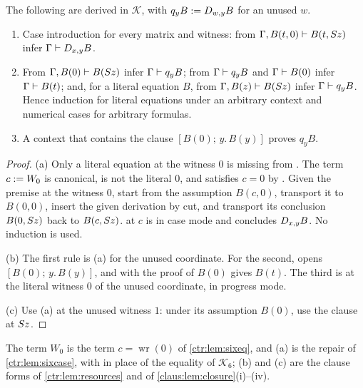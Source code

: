 \begin{proposition}
\label{disch:prop:sd-basis}
The following are derived in $\mathcal K$, with $q_yB\mathrel{:=}D_{w,y}B$ for
an unused $w$.
\begin{enumerate}[label=\textup{(\alph*)}]
\item Case introduction for every matrix and witness: from
 $\Gamma,B(t,0)\vdash B(t,S z)$ infer $\Gamma\vdash D_{x,y}B$.
\item From $\Gamma,B(0)\vdash B(S z)$ infer $\Gamma\vdash q_yB$; from
 $\Gamma\vdash q_yB$ and $\Gamma\vdash B(0)$ infer $\Gamma\vdash B(t)$;
 and, for a literal equation $B$, from $\Gamma,B(z)\vdash B(S z)$
 infer $\Gamma\vdash q_yB$. Hence induction for literal equations under
 an arbitrary context and numerical cases for arbitrary formulas.
\item A context that contains the clause $[B(0);\,y.\,B(y)]$ proves
 $q_yB$.
\end{enumerate}
\end{proposition}

\begin{proof}
(a) Only a literal equation at the witness $0$ is missing from
. The term $c\mathrel{:=} W_0$ is canonical, is not the literal
$0$, and satisfies $c=0$ by . Given the premise at the
witness $0$, start from the assumption $B(c,0)$, transport it to $B(0,0)$,
insert the given derivation by cut, and transport its conclusion
$B(0,S z)$ back to $B(c,S z)$.  at $c$ is in case
mode and concludes $D_{x,y}B$. No induction is used.

(b) The first rule is (a) for the unused coordinate. For the second,
 opens $[B(0);\,y.\,B(y)]$, and  with the
proof of $B(0)$ gives $B(t)$. The third is  at the literal
witness $0$ of the unused coordinate, in progress mode.

(c) Use (a) at the unused witness $1$: under its assumption $B(0)$, use
the clause at $S z$.
\end{proof}

The term $W_0$ is the term $c=\operatorname{wr}(0)$ of \cref{ctr:lem:sixeq},
and (a) is the repair of \cref{ctr:lem:sixcase}, with  in
place of the equality of $\mathcal K_6$; (b) and (c) are the clause forms
of \cref{ctr:lem:resources} and of \cref{claus:lem:closure}(i)--(iv).

